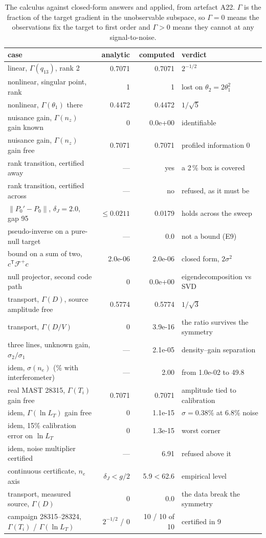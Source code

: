 \begin{table}[htbp]
\centering
\caption{The calculus against closed-form answers and applied, from artefact A22. $\Gamma$ is the fraction of the target gradient in the unobservable subspace, so $\Gamma=0$ means the observations fix the target to first order and $\Gamma>0$ means they cannot at any signal-to-noise.}
\label{tab:sdtif}
\footnotesize
\begin{tabular}{@{}lrrl@{}}
\toprule
case & analytic & computed & verdict \\
\midrule
linear, $\Gamma(q_{13})$, rank 2 & 0.7071 & 0.7071 & $2^{-1/2}$ \\
nonlinear, singular point, rank & 1 & 1 & lost on $\theta_2=2\theta_1^2$ \\
nonlinear, $\Gamma(\theta_1)$ there & 0.4472 & 0.4472 & $1/\sqrt5$ \\
nuisance gain, $\Gamma(n_z)$ gain known & 0 & 0.0e+00 & identifiable \\
nuisance gain, $\Gamma(n_z)$ gain free & 0.7071 & 0.7071 & profiled information 0 \\
rank transition, certified away & --- & yes & a 2\,\% box is covered \\
rank transition, certified across & --- & no & refused, as it must be \\
$\|P_0'-P_0\|$, $\delta_J=2.0$, gap 95 & $\leq0.0211$ & 0.0179 & holds across the sweep \\
pseudo-inverse on a pure-null target & --- & 0.0 & not a bound (E9) \\
bound on a sum of two, $c^{\mathsf T}\mathcal F^{+}c$ & 2.0e-06 & 2.0e-06 & closed form, $2\sigma^2$ \\
null projector, second code path & 0 & 0.0e+00 & eigendecomposition vs SVD \\
\midrule
transport, $\Gamma(D)$, source amplitude free & 0.5774 & 0.5774 & $1/\sqrt3$ \\
transport, $\Gamma(D/V)$ & 0 & 3.9e-16 & the ratio survives the symmetry \\
three lines, unknown gain, $\sigma_2/\sigma_1$ & --- & 2.1e-05 & density--gain separation \\
idem, $\sigma(n_e)$ (\% with interferometer) & --- & 2.00 & from 1.0e-02 to 49.8 \\
real MAST 28315, $\Gamma(T_i)$ gain free & 0.7071 & 0.7071 & amplitude tied to calibration \\
idem, $\Gamma(\ln L_T)$ gain free & 0 & 1.1e-15 & $\sigma=0.38$\% at 6.8\% noise \\
idem, 15\% calibration error on $\ln L_T$ & 0 & 1.3e-15 & worst corner \\
idem, noise multiplier certified & --- & 6.91 & refused above it \\
continuous certificate, $n_e$ axis & $\delta_J<g/2$ & 5.9$<$62.6 & empirical level \\
transport, measured source, $\Gamma(D)$ & 0 & 0.0 & the data break the symmetry \\
campaign 28315--28324, $\Gamma(T_i)$ / $\Gamma(\ln L_T)$ & $2^{-1/2}$ / 0 & 10 / 10 of 10 & certified in 9 \\
\bottomrule
\end{tabular}
\end{table}
